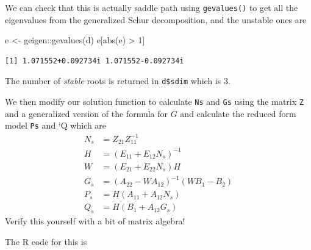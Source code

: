 \documentclass[
  letterpaper,
]{book}
\newenvironment{Shaded}{\begin{snugshade}}{\end{snugshade}}
\newcommand{\DecValTok}[1]{\textcolor[rgb]{0.68,0.00,0.00}{#1}}
\newcommand{\FunctionTok}[1]{\textcolor[rgb]{0.28,0.35,0.67}{#1}}
\newcommand{\NormalTok}[1]{\textcolor[rgb]{0.00,0.23,0.31}{#1}}
\newcommand{\OtherTok}[1]{\textcolor[rgb]{0.00,0.23,0.31}{#1}}
\newcommand{\SpecialCharTok}[1]{\textcolor[rgb]{0.37,0.37,0.37}{#1}}
\begin{document}
We can check that this is actually saddle path using \texttt{gevalues()}
to get all the eigenvalues from the generalized Schur decomposition, and
the unstable ones are

\begin{Shaded}
\begin{Highlighting}[]
\NormalTok{e }\OtherTok{\textless{}{-}}\NormalTok{ geigen}\SpecialCharTok{::}\FunctionTok{gevalues}\NormalTok{(d)}
\NormalTok{e[}\FunctionTok{abs}\NormalTok{(e) }\SpecialCharTok{\textgreater{}} \DecValTok{1}\NormalTok{]}
\end{Highlighting}
\end{Shaded}

\begin{verbatim}
[1] 1.071552+0.092734i 1.071552-0.092734i
\end{verbatim}

The number of \emph{stable} roots is returned in \texttt{d\$sdim} which
is 3.

We then modify our solution function to calculate \texttt{Ns} and
\texttt{Gs} using the matrix \texttt{Z} and a generalized version of the
formula for \(G\) and calculate the reduced form model \texttt{Ps} and
`Q which are \begin{align}
    N_s &= Z_{21} Z_{11}^{-1} \\
    H   &= (E_{11} + E_{12} N_s)^{-1} \\
    W   &= (E_{21} + E_{22} N_s) H\\
    G_s &= (A_{22} - W A_{12})^{-1} (W B_1 - B_2) \\
    P_s &= H (A_{11} + A_{12} N_s) \\
    Q_s &= H (B_1 + A_{12} G_s)
\end{align} Verify this yourself with a bit of matrix algebra!

The R code for this is
\end{document}
